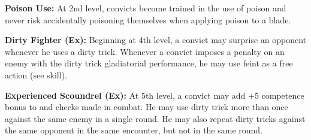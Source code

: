 {\textbf{Poison Use:} At 2nd level, convicts become trained in the use of poison and never risk accidentally poisoning themselves when applying poison to a blade.

\textbf{Dirty Fighter (Ex):} Beginning at 4th level, a convict may surprise an opponent whenever he uses a dirty trick. Whenever a convict imposes a penalty on an enemy with the dirty trick gladiatorial performance, he may use feint as a free action (see  skill).

\textbf{Experienced Scoundrel (Ex):} At 5th level, a convict may add +5 competence bonus to  and  checks made in combat. He may use dirty trick more than once against the same enemy in a single round. He may also repeat dirty tricks against the same opponent in the same encounter, but not in the same round.

}
